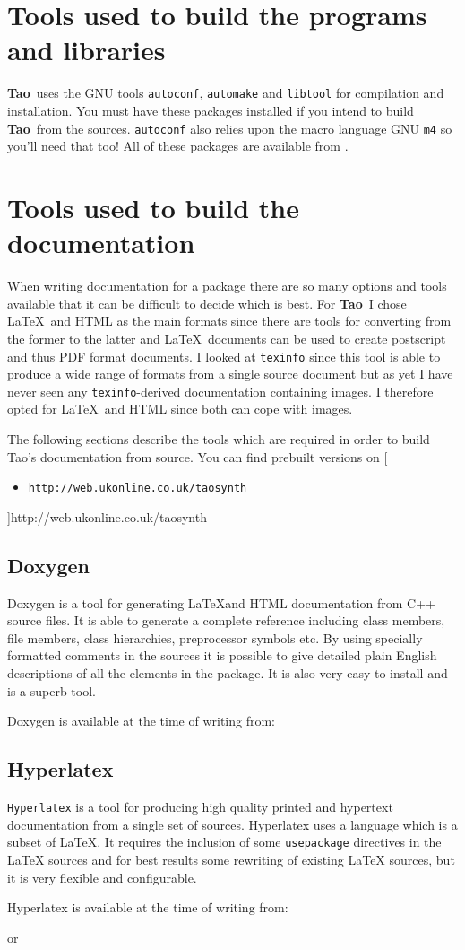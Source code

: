 \documentclass[a4paper,twoside]{report}
\newcommand{\tao}{\textbf{Tao}}
\newcommand{\TaoWebSite}{\xlink{the Tao home page}[\begin{itemize}\item\Path{http://web.ukonline.co.uk/taosynth}\end{itemize}]{http://web.ukonline.co.uk/taosynth}}
\newcommand{\Path}[1]{\texttt{#1}}
\begin{document}
\section{Tools used to build the programs and libraries}
\tao\ uses the GNU tools \verb|autoconf|, \verb|automake| and
\verb|libtool| for compilation and installation. You must have these
packages installed if you intend to build \tao\ from the sources.
\verb|autoconf| also relies upon the macro language GNU \verb|m4|
so you'll need that too! All of these packages are available from
.

\section{Tools used to build the documentation}
When writing documentation for a package there are so many options
and tools available that it can be difficult to decide which is
best. For \tao\ I chose \LaTeX\ and HTML as the main formats since
there are tools for converting from the former to the latter and
\LaTeX\ documents can be used to create postscript and thus PDF
format documents. I looked at \verb|texinfo| since this tool
is able to produce a wide range of formats from a single source
document but as yet I have never seen any \verb|texinfo|-derived
documentation containing images. I therefore opted for \LaTeX\ and
HTML since both can cope with images.

The following sections describe the tools which are required in order
to build Tao's documentation from source. You can find prebuilt
versions on \TaoWebSite

\subsection{Doxygen}
Doxygen is a tool for generating \LaTeX and HTML
documentation from C++ source files. It is able to generate a
complete reference including class members, file members, class
hierarchies, preprocessor symbols etc. By using specially formatted
comments in the sources it is possible to give detailed plain
English descriptions of all the elements in the package. It is
also very easy to install and is a superb tool.

Doxygen is available at the time of writing from:


\subsection{Hyperlatex}
\verb|Hyperlatex| is a tool for producing high quality printed and
hypertext documentation from a single set of sources. Hyperlatex
uses a language which is a subset of \LaTeX. It requires
the inclusion of some \verb|usepackage| directives in the \LaTeX
sources and for best results some rewriting of existing \LaTeX
sources, but it is very flexible and configurable.

Hyperlatex is available at the time of writing from:


or

\end{document}
